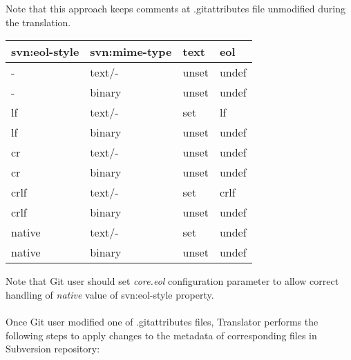 Note that this approach keeps comments at .gitattributes file unmodified during the translation.

\begin{center}
\begin{tabular}{ | p{} | p{} | p{} | p{} |}
	\hline
	svn:eol-style &   svn:mime-type &   text  & eol \\ \hline \hline
	-             &   text/-        &   unset & undef \footnotemark[1] \footnotemark[2] \\ \hline
	-             &   binary        &   unset & undef \\ \hline
	lf            &   text/-        &   set   & lf \\ \hline
	lf            &   binary        &   unset & undef \\ \hline
	cr            &   text/-        &   unset & undef  \footnotemark[3] \\ \hline
	cr            &   binary        &   unset & undef \\ \hline
	crlf          &   text/-        &   set   & crlf \\ \hline
	crlf          &   binary        &   unset & undef \\ \hline
	native        &   text/-        &   set   & undef \footnotemark[4] \\ \hline
	native        &   binary        &   unset & undef \\ \hline
\end{tabular}
\label{eol_mime_svn_to_git}
\end{center}

Note that Git user should set \emph{core.eol} configuration parameter to allow correct handling of \emph{native} value of svn:eol-style property.
\\\\
Once Git user modified one of .gitattributes files, Translator performs the following steps to apply changes to the metadata of corresponding files in Subversion repository:

